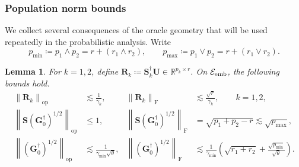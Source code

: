 \documentclass[11pt]{article}
\newtheorem{lemma}{Lemma}
\newcommand{\opn}[1]{\left\lVert #1\right\rVert_{\mathrm{op}}}
\newcommand{\frn}[1]{\left\lVert #1\right\rVert_{\mathrm{F}}}
\newcommand{\cE}{\mathcal{E}}
\newcommand{\gmin}{\gamma_{\min}}
\begin{document}
\subsubsection{Population norm bounds}
\label{app:population-norm-bounds}

We collect several consequences of the oracle geometry that will be used
repeatedly in the probabilistic analysis.  Write
\[
  p_{\min}\coloneqq p_1\wedge p_2
  =r+(r_1\wedge r_2),
  \qquad
  p_{\max}\coloneqq p_1\vee p_2
  =r+(r_1\vee r_2).
\]
\begin{lemma}
\label{lem:population-norm-bounds}
For $k=1,2$, define $\bm R_k\coloneqq\bm S_k^\dagger\bm U\in\mathbb R^{p_k\times r}$. On $\cE_{\rm emb}$, the following bounds hold.
\begin{subequations}
\label{eq:population-geometry-bounds}
\begin{align}
\label{eq:population-Rk-bounds}
  \opn{\bm R_k}
  &\lesssim
  \frac{1}{\gamma_k},
  &
  \frn{\bm R_k}
  &\lesssim
  \frac{\sqrt r}{\gamma_k},
  \qquad k=1,2,
\\
\label{eq:population-SGamma-bounds}
  \opn{\bm S(\bm G_0^\dagger)^{1/2}}
  &\le 1,
  &
  \frn{\bm S(\bm G_0^\dagger)^{1/2}}
  &=
  \sqrt{p_1+p_2-r}
  \lesssim
  \sqrt{p_{\max}},
\\
\label{eq:population-Gamma-bounds}
  \opn{(\bm G_0^\dagger)^{1/2}}
  &\lesssim
  \frac{1}{\gmin\sqrt\theta},
  &
  \frn{(\bm G_0^\dagger)^{1/2}}
  &\lesssim
  \frac{1}{\gmin}
  \left(
    \sqrt{r_1+r_2}
    +
    \frac{\sqrt{p_{\min}}}{\sqrt\theta}
  \right).
\end{align}
\end{subequations}
\end{lemma}
\end{document}
